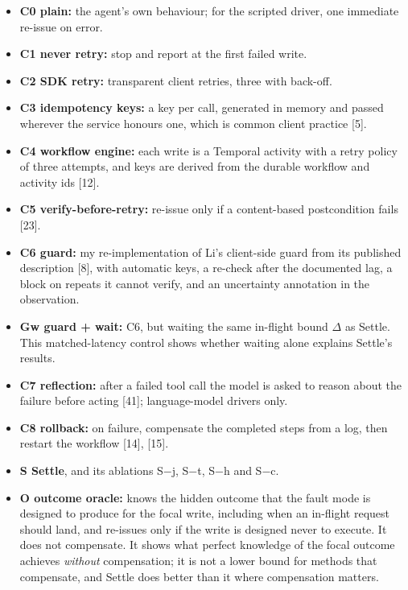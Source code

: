 \documentclass[
  10pt,
]{article}
\providecommand{\tightlist}{%
  \setlength{\itemsep}{0pt}\setlength{\parskip}{0pt}}
\begin{document}
\begin{itemize}
\tightlist
\item
  \textbf{C0 plain:} the agent's own behaviour; for the scripted driver,
  one immediate re-issue on error.
\item
  \textbf{C1 never retry:} stop and report at the first failed write.
\item
  \textbf{C2 SDK retry:} transparent client retries, three with
  back-off.
\item
  \textbf{C3 idempotency keys:} a key per call, generated in memory and
  passed wherever the service honours one, which is common client
  practice {[}5{]}.
\item
  \textbf{C4 workflow engine:} each write is a Temporal activity with a
  retry policy of three attempts, and keys are derived from the durable
  workflow and activity ids {[}12{]}.
\item
  \textbf{C5 verify-before-retry:} re-issue only if a content-based
  postcondition fails {[}23{]}.
\item
  \textbf{C6 guard:} my re-implementation of Li's client-side guard from
  its published description {[}8{]}, with automatic keys, a re-check
  after the documented lag, a block on repeats it cannot verify, and an
  uncertainty annotation in the observation.
\item
  \textbf{Gw guard + wait:} C6, but waiting the same in-flight bound
  \(\Delta\) as Settle. This matched-latency control shows whether
  waiting alone explains Settle's results.
\item
  \textbf{C7 reflection:} after a failed tool call the model is asked to
  reason about the failure before acting {[}41{]}; language-model
  drivers only.
\item
  \textbf{C8 rollback:} on failure, compensate the completed steps from
  a log, then restart the workflow {[}14{]}, {[}15{]}.
\item
  \textbf{S Settle}, and its ablations S−j, S−t, S−h and S−c.
\item
  \textbf{O outcome oracle:} knows the hidden outcome that the fault
  mode is designed to produce for the focal write, including when an
  in-flight request should land, and re-issues only if the write is
  designed never to execute. It does not compensate. It shows what
  perfect knowledge of the focal outcome achieves \emph{without}
  compensation; it is not a lower bound for methods that compensate, and
  Settle does better than it where compensation matters.
\end{itemize}
\end{document}

